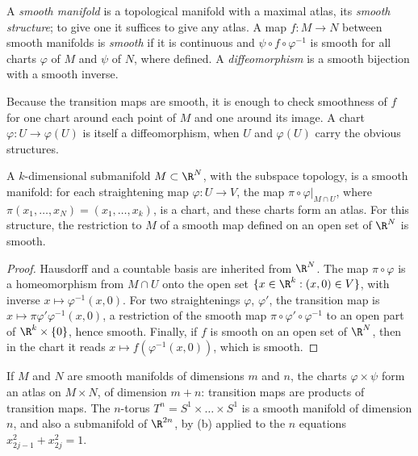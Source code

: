 \begin{definition}
A \emph{smooth manifold} is a topological manifold with a maximal atlas, its \emph{smooth structure}; to give one it suffices to give any atlas. A map
$f\colon M\to N$ between smooth manifolds is \emph{smooth} if it is continuous and $\psi\circ f\circ\varphi^{-1}$ is smooth for all charts $\varphi$ of $M$
and $\psi$ of $N$, where defined. A \emph{diffeomorphism} is a smooth bijection with a smooth inverse.
\end{definition}

Because the transition maps are smooth, it is enough to check smoothness of $f$ for one chart around each point of $M$ and one around its image. A chart
$\varphi\colon U\to\varphi(U)$ is itself a diffeomorphism, when $U$ and $\varphi(U)$ carry the obvious structures.

\begin{proposition}\label{prop:subisman}
A $k$-dimensional submanifold $M\subset\R^N$, with the subspace topology, is a smooth manifold: for each straightening map $\varphi\colon U\to V$, the
map $\pi\circ\varphi|_{M\cap U}$, where $\pi(x_1,\dots,x_N)=(x_1,\dots,x_k)$, is a chart, and these charts form an atlas. For this structure, the
restriction to $M$ of a smooth map defined on an open set of $\R^N$ is smooth.
\end{proposition}
\begin{proof}
Hausdorff and a countable basis are inherited from $\R^N$. The map $\pi\circ\varphi$ is a homeomorphism from $M\cap U$ onto the open set
$\{x\in\R^k:(x,0)\in V\}$, with inverse $x\mapsto\varphi^{-1}(x,0)$. For two straightenings $\varphi$, $\varphi'$, the transition map is
$x\mapsto\pi\varphi'\varphi^{-1}(x,0)$, a restriction of the smooth map $\pi\circ\varphi'\circ\varphi^{-1}$ to an open part of $\R^k\times\{0\}$, hence
smooth. Finally, if $f$ is smooth on an open set of $\R^N$, then in the chart it reads $x\mapsto f(\varphi^{-1}(x,0))$, which is smooth.
\end{proof}

\begin{example}
If $M$ and $N$ are smooth manifolds of dimensions $m$ and $n$, the charts $\varphi\times\psi$ form an atlas on $M\times N$, of dimension $m+n$: transition
maps are products of transition maps. The $n$-torus $T^n=S^1\times\dots\times S^1$ is a smooth manifold of dimension $n$, and also a submanifold of
$\R^{2n}$, by (b) applied to the $n$ equations $x_{2j-1}^2+x_{2j}^2=1$.
\end{example}

